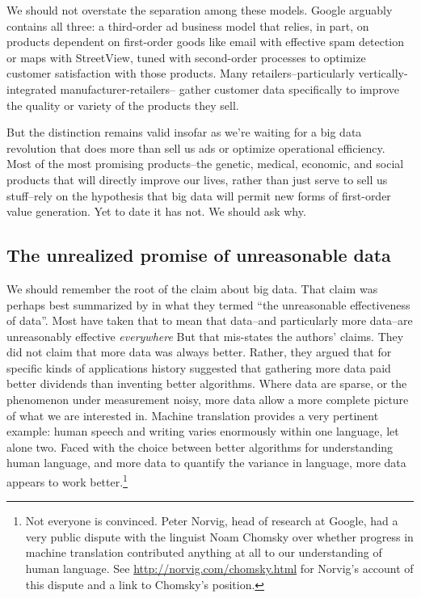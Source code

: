 \documentclass[12pt]{article}
\begin{document}
We should not overstate the separation among these models. Google
arguably contains all three: a third-order ad business model that
relies, in part, on products dependent on first-order goods like email
with effective spam detection or maps with StreetView, tuned with
second-order processes to optimize customer satisfaction with those
products. Many retailers--particularly vertically-integrated
manufacturer-retailers-- gather customer data specifically to improve
the quality or variety of the products they sell.

But the distinction remains valid insofar as we're waiting for a big
data revolution that does more than sell us ads or optimize
operational efficiency. Most of the most promising products--the
genetic, medical, economic, and social products that will directly
improve our lives, rather than just serve to sell us stuff--rely on
the hypothesis that big data will permit new forms of first-order
value generation. Yet to date it has not. We should ask why. 

\subsection{The unrealized promise of unreasonable data}
\label{sec:unre-prom-unre}

We should remember the root of the claim about big data. That claim
was perhaps best summarized by \cite{halevy2009unreasonable} in what
they termed ``the unreasonable effectiveness of data''. Most have
taken that to mean that data--and particularly more data--are
unreasonably effective \textit{everywhere} But that mis-states the authors'
claims. They did not claim that more data was always better. Rather,
they argued that for specific kinds
of applications history suggested that gathering more data paid better
dividends than inventing better algorithms. Where data are sparse, or
the phenomenon under measurement noisy, more data allow a more
complete picture of what we are interested in. Machine translation
provides a very pertinent example: human speech and writing varies
enormously within one language, let alone two. Faced with the choice
between better algorithms for understanding human language, and more
data to quantify the variance in language, more data appears to work
better.\footnote{Not everyone is convinced. Peter Norvig, head of
  research at Google, had a very public dispute with the linguist Noam
Chomsky over whether progress in machine translation contributed
anything at all to our understanding of human language. See
\url{http://norvig.com/chomsky.html} for Norvig's account of this
dispute and a link to Chomsky's position.} 
\end{document}

